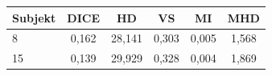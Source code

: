 \begin{tabular}{l c c c c c}
 \hline
Subjekt & DICE & HD & VS & MI & MHD \\ \hline
8 & 0,162 & 28,141 & 0,303 & 0,005 & 1,568 \\
15 & 0,139 & 29,929 & 0,328 & 0,004 & 1,869 \\
\hline 
 \end{tabular}
